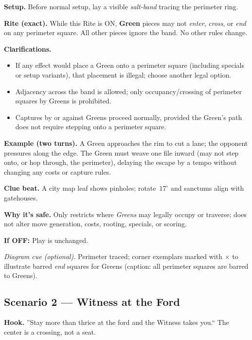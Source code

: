 \documentclass[11pt]{article}
\numberwithin{equation}{section} %
\theoremstyle{plain} %
\theoremstyle{definition} %
\theoremstyle{remark} %
\begin{document}
\medskip
\noindent\textbf{Setup.} Before normal setup, lay a visible \emph{salt-band} tracing the perimeter ring.

\medskip
\noindent\textbf{Rite (exact).} While this Rite is \textsc{ON}, \textbf{Green} pieces may not \emph{enter}, \emph{cross}, or \emph{end} on any perimeter square. All other pieces ignore the band. No other rules change.

\medskip
\noindent\textbf{Clarifications.}
\begin{itemize}\setlength\itemsep{0.25em}
  \item If any effect would place a Green onto a perimeter square (including specials or setup variants), that placement is illegal; choose another legal option.
  \item Adjacency across the band is allowed; only occupancy/crossing of perimeter squares by Greens is prohibited.
  \item Captures by or against Greens proceed normally, provided the Green's path does not require stepping onto a perimeter square.
\end{itemize}

\medskip
\noindent\textbf{Example (two turns).}  
A Green approaches the rim to cut a lane; the opponent pressures along the edge. The Green must weave one file inward (may not step onto, or hop through, the perimeter), delaying the escape by a tempo without changing any costs or capture rules.

\medskip
\noindent\textbf{Clue beat.} A city map leaf shows pinholes; rotate \(\,17^\circ\) and sanctums align with gatehouses.

\medskip
\noindent\textbf{Why it's safe.} Only restricts where \emph{Greens} may legally occupy or traverse; does not alter move generation, costs, rooting, specials, or scoring.

\medskip
\noindent\textbf{If \textsc{OFF}:} Play is unchanged.

\medskip
\noindent\textit{Diagram cue (optional).} Perimeter traced; corner exemplars marked with \(\times\) to illustrate barred \emph{end} squares for Greens (caption: all perimeter squares are barred to Greens).

\subsection{Scenario 2 --- Witness at the Ford}
\label{scen:witness-ford}

\noindent\textbf{Hook.} ''Stay more than thrice at the ford and the Witness takes you.`` The center is a crossing, not a seat.
\end{document}
